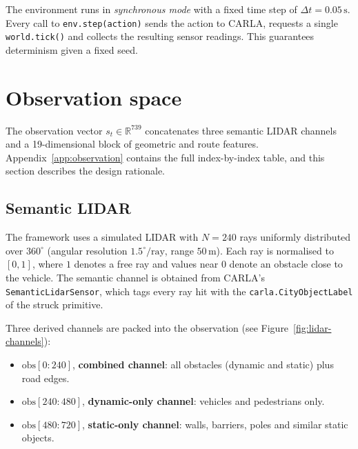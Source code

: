 The environment runs in \emph{synchronous mode} with a fixed time step of \(\Delta t =
0.05\,\mathrm{s}\). Every call to \texttt{env.step(action)} sends the action to CARLA, requests
a single \texttt{world.tick()} and collects the resulting sensor readings. This guarantees
determinism given a fixed seed.

\section{Observation space}\label{sec:design-obs}

The observation vector \(s_t \in \mathbb{R}^{739}\) concatenates three semantic LIDAR channels
and a 19-dimensional block of geometric and route features. Appendix~\ref{app:observation}
contains the full index-by-index table, and this section describes the design rationale.

\subsection{Semantic LIDAR}\label{sec:design-obs-lidar}

The framework uses a simulated LIDAR with \(N = 240\) rays uniformly distributed over
\(360^\circ\) (angular resolution \(1.5^\circ/\text{ray}\), range \(50\,\mathrm{m}\)). Each
ray is normalised to \([0, 1]\), where \(1\) denotes a free ray and values near \(0\) denote
an obstacle close to the vehicle. The semantic channel is obtained from CARLA's
\texttt{SemanticLidarSensor}, which tags every ray hit with the
\texttt{carla.CityObjectLabel} of the struck primitive.

Three derived channels are packed into the observation (see Figure~\ref{fig:lidar-channels}):

\begin{itemize}
  \item \(\text{obs}[0{:}240]\), \textbf{combined channel}: all obstacles
        (dynamic and static) plus road edges.
  \item \(\text{obs}[240{:}480]\), \textbf{dynamic-only channel}: vehicles and
        pedestrians only.
  \item \(\text{obs}[480{:}720]\), \textbf{static-only channel}: walls, barriers,
        poles and similar static objects.
\end{itemize}

